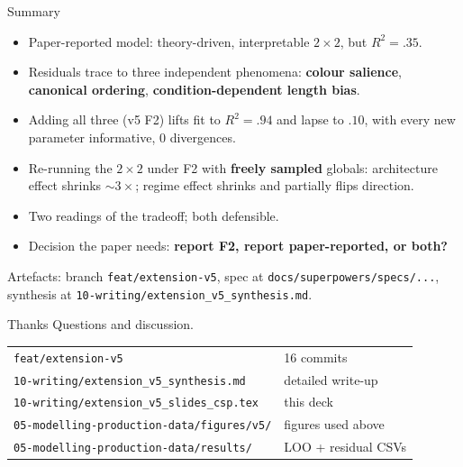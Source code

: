 \documentclass[10pt,aspectratio=169]{beamer}
\newcommand{\main}[1]{\textcolor{CSP-main-dark}{\textbf{#1}}}
\newcommand{\emp}[1]{\textcolor{CSP-emphasis}{\textbf{#1}}}
\newcommand{\muted}[1]{\textcolor{CSP-text-light}{#1}}
\begin{document}
\begin{frame}{Summary}
\small
\begin{itemize}\itemsep0.3em
  \item Paper-reported model: theory-driven, interpretable $2\!\times\!2$, but $R^2 = .35$.
  \item Residuals trace to three independent phenomena: \main{colour salience}, \main{canonical ordering}, \main{condition-dependent length bias}.
  \item Adding all three (v5 F2) lifts fit to $R^2 = .94$ and lapse to $.10$, with every new parameter informative, 0 divergences.
  \item Re-running the $2\!\times\!2$ under F2 with \emp{freely sampled} globals: architecture effect shrinks $\sim\!3\times$; regime effect shrinks and partially flips direction.
  \item Two readings of the tradeoff; both defensible.
  \item Decision the paper needs: \emp{report F2, report paper-reported, or both?}
\end{itemize}

\vspace{1em}
\muted{Artefacts: branch \texttt{feat/extension-v5},
spec at \texttt{docs/superpowers/specs/...},
synthesis at \texttt{10-writing/extension\_v5\_synthesis.md}.}
\end{frame}

\begin{frame}{Thanks}
\centering
\vspace{2em}
\Large Questions and discussion.

\vspace{2em}
\normalsize
\begin{tabular}{ll}
\texttt{feat/extension-v5} & 16 commits \\
\texttt{10-writing/extension\_v5\_synthesis.md} & detailed write-up \\
\texttt{10-writing/extension\_v5\_slides\_csp.tex} & this deck \\
\texttt{05-modelling-production-data/figures/v5/} & figures used above \\
\texttt{05-modelling-production-data/results/} & LOO + residual CSVs \\
\end{tabular}
\end{frame}
\end{document}
